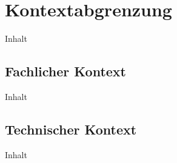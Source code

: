 \chapter{Kontextabgrenzung\label{chap3:Drittes-Kapitel}}

Inhalt

\section{Fachlicher Kontext\label{sec3.1:Unterpunkt-1}}

Inhalt

\section{Technischer Kontext\label{sec3.2:Unterpunkt-2}}

Inhalt